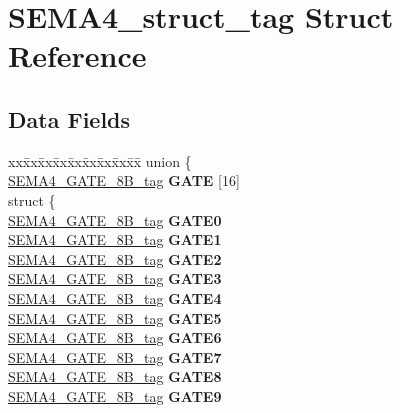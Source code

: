 \hypertarget{structSEMA4__struct__tag}{}\section{S\+E\+M\+A4\+\_\+struct\+\_\+tag Struct Reference}
\label{structSEMA4__struct__tag}
\subsection*{Data Fields}
\begin{DoxyCompactItemize}
\item 
\mbox{\label{structSEMA4__struct__tag_af442defe18117223a4fc8060090c8a8e}} 
\begin{tabbing}
xx\=xx\=xx\=xx\=xx\=xx\=xx\=xx\=xx\=\kill
union \{\\
\>\mbox{\hyperlink{unionSEMA4__GATE__8B__tag}{SEMA4\_GATE\_8B\_tag}} {\bfseries GATE} \mbox{[}16\mbox{]}\\
\mbox{\label{unionSEMA4__struct__tag_1_1_0D2176_a012cce9af5ac87aeb5306f3d65081c67}} 
\>struct \{\\
\>\>\mbox{\hyperlink{unionSEMA4__GATE__8B__tag}{SEMA4\_GATE\_8B\_tag}} {\bfseries GATE0}\\
\>\>\mbox{\hyperlink{unionSEMA4__GATE__8B__tag}{SEMA4\_GATE\_8B\_tag}} {\bfseries GATE1}\\
\>\>\mbox{\hyperlink{unionSEMA4__GATE__8B__tag}{SEMA4\_GATE\_8B\_tag}} {\bfseries GATE2}\\
\>\>\mbox{\hyperlink{unionSEMA4__GATE__8B__tag}{SEMA4\_GATE\_8B\_tag}} {\bfseries GATE3}\\
\>\>\mbox{\hyperlink{unionSEMA4__GATE__8B__tag}{SEMA4\_GATE\_8B\_tag}} {\bfseries GATE4}\\
\>\>\mbox{\hyperlink{unionSEMA4__GATE__8B__tag}{SEMA4\_GATE\_8B\_tag}} {\bfseries GATE5}\\
\>\>\mbox{\hyperlink{unionSEMA4__GATE__8B__tag}{SEMA4\_GATE\_8B\_tag}} {\bfseries GATE6}\\
\>\>\mbox{\hyperlink{unionSEMA4__GATE__8B__tag}{SEMA4\_GATE\_8B\_tag}} {\bfseries GATE7}\\
\>\>\mbox{\hyperlink{unionSEMA4__GATE__8B__tag}{SEMA4\_GATE\_8B\_tag}} {\bfseries GATE8}\\
\>\>\mbox{\hyperlink{unionSEMA4__GATE__8B__tag}{SEMA4\_GATE\_8B\_tag}} {\bfseries GATE9}\\

\end{tabbing}
\end{DoxyCompactItemize}

